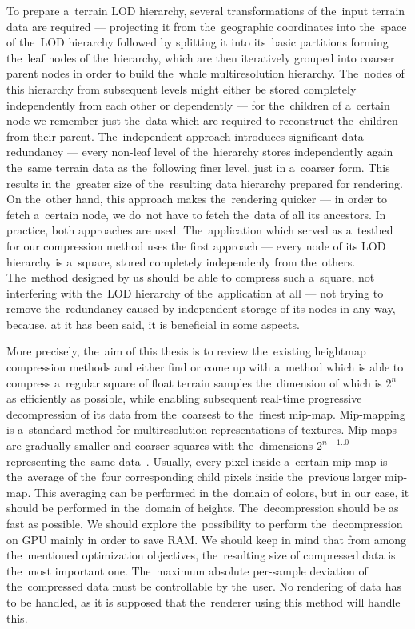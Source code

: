 To prepare a~terrain LOD hierarchy, several transformations of the~input terrain data are required --- projecting it from the~geographic coordinates into the~space of the~LOD hierarchy followed by splitting it into its~basic partitions forming the~leaf nodes of the~hierarchy, which are then iteratively grouped into coarser parent nodes in order to build the~whole multiresolution hierarchy. The~nodes of this hierarchy from subsequent levels might either be stored completely independently from each other or dependently --- for the~children of a~certain node we remember just the~data which are required to reconstruct the~children from their parent. The~independent approach introduces significant data redundancy --- every non-leaf level of the~hierarchy stores independently again the~same terrain data as the~following finer level, just in a~coarser form. This results in the~greater size of the~resulting data hierarchy prepared for rendering. On the~other hand, this approach makes the~rendering quicker --- in order to fetch a~certain node, we do~not have to fetch the~data of all its ancestors. In practice, both approaches are used. The~application which served as a~testbed for our compression method uses the first approach --- every node of its LOD hierarchy is a~square, stored completely independenly from the~others. The~method designed by us should be able to compress such a~square, not interfering with the~LOD hierarchy of the~application at all --- not trying to remove the~redundancy caused by independent storage of its nodes in any way, because, at it has been said, it is beneficial in some aspects.

More precisely, the~aim of this thesis is to review the~existing heightmap compression methods and either find or come up with a~method which is able to compress a~regular square of float terrain samples the~dimension of which is $2^n$ as efficiently as possible, while enabling subsequent real-time progressive decompression of its data from the~coarsest to the~finest mip-map. Mip-mapping is a~standard method for multiresolution representations of textures. Mip-maps are gradually smaller and coarser squares with the~dimensions $2^{n-1 .. 0}$ representing the~same data~\cite{basics}. Usually, every pixel inside a~certain mip-map is the~average of the~four corresponding child pixels inside the~previous larger mip-map. This averaging can be performed in the~domain of colors, but in our case, it should be performed in the~domain of heights. The~decompression should be as fast as possible. We should explore the~possibility to perform the~decompression on GPU mainly in order to save RAM. We should keep in mind that from among the~mentioned optimization objectives, the~resulting size of compressed data is the~most important one. The~maximum absolute per-sample deviation of the~compressed data must be controllable by the~user. No rendering of data has to be handled, as it is supposed that the~renderer using this method will handle this. 

